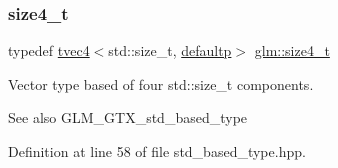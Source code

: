 \subsubsection{\texorpdfstring{size4\_t}{size4\_t}}
{\footnotesize\ttfamily typedef \mbox{\hyperlink{structglm_1_1tvec4}{tvec4}}$<$std\+::size\+\_\+t, \mbox{\hyperlink{namespaceglm_a0f04f086094c747d227af4425893f545a9d21ccd8b5a009ec7eb7677befc3bf51}{defaultp}}$>$ \mbox{\hyperlink{group__gtx__std__based__type_gaa4f69cfac1c3e014a50fd090974092ec}{glm\+::size4\+\_\+t}}}

Vector type based of four std\+::size\+\_\+t components. \begin{DoxySeeAlso}{See also}
G\+L\+M\+\_\+\+G\+T\+X\+\_\+std\+\_\+based\+\_\+type 
\end{DoxySeeAlso}


Definition at line 58 of file std\+\_\+based\+\_\+type.\+hpp.

